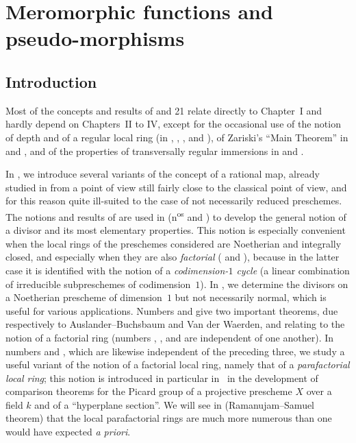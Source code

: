 \section{Meromorphic functions and pseudo-morphisms}
\label{IV.20}

\setcounter{subsection}{-1}
\subsection{Introduction}
\label{IV.20.0}

Most of the concepts and results of \textsection{} and 21 relate directly to Chapter~I and hardly depend on Chapters~II to IV, except for the occasional use of the notion of depth and of a regular local ring (in , , , and ), of Zariski's ``Main Theorem'' in  and , and of the properties of transversally regular immersions in  and .

In , we introduce several variants of the concept of a rational map, already studied in  from a point of view still fairly close to the classical point of view, and for this reason quite ill-suited to the case of not necessarily reduced preschemes.
The notions and results of  are used in  (n\textsuperscript{os} and ) to develop the general notion of a divisor and its most elementary properties.
This notion is especially convenient when the local rings of the preschemes considered are Noetherian and integrally closed, and especially when they are also \emph{factorial} ( and ), because in the latter case it is identified with the notion of a \emph{codimension-$1$ cycle} (a linear combination of irreducible subpreschemes of codimension~$1$).
In ,  we determine the divisors on a Noetherian prescheme of dimension~$1$ but not necessarily normal, which is useful for various applications.
Numbers  and  give two important theorems, due respectively to Auslander--Buchsbaum and Van der Waerden, and relating to the notion of a factorial ring (numbers , , and  are independent of one another).
In numbers  and , which are likewise independent of the preceding three, we study a useful variant of the notion of a factorial local ring, namely that of a \emph{parafactorial local ring}; this notion is introduced in particular in~\cite{IV-41} in the development of comparison theorems for the Picard group of a projective prescheme $X$ over a field $k$ and of a ``hyperplane section''.
We will see in  (Ramanujam--Samuel theorem) that the local parafactorial rings are much more numerous than one would have expected \emph{a priori}.

